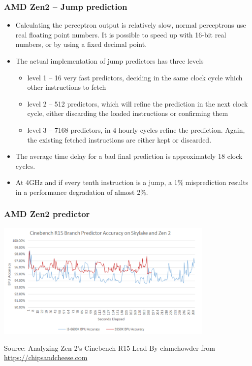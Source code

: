 \documentclass{beamer}
\begin{document}
\begin{frame}
\frametitle{AMD Zen2 -- Jump prediction}

\begin{itemize}
\item Calculating the perceptron output is relatively slow, normal perceptrons use real floating point numbers. It is possible to speed up with 16-bit real numbers, or by using a fixed decimal point.
\item The actual implementation of jump predictors has three levels
\begin{itemize}
\item level 1 -- 16 very fast predictors, deciding in the same clock cycle which other instructions to fetch
\item level 2 -- 512 predictors, which will refine the prediction in the next clock cycle, either discarding the loaded instructions or confirming them
\item level 3 -- 7168 predictors, in 4 hourly cycles refine the prediction. Again, the existing fetched instructions are either kept or discarded.
\end{itemize}
\item The average time delay for a bad final prediction is approximately 18 clock cycles.
\item At 4GHz and if every tenth instruction is a jump, a 1\% misprediction results in a performance degradation of almost 2\%.
\end{itemize}
\end{frame}


\begin{frame}
\frametitle{AMD Zen2 predictor}

\begin{center}
\includegraphics[width=0.8\textwidth]{fig/amd_cinebench.png}
\end{center}

Source: Analyzing Zen 2's Cinebench R15 Lead
By clamchowder from \url{https://chipsandcheese.com}
\end{frame}
\end{document}
